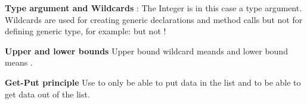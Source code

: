 \documentclass{article}
\begin{document}
\begin{Parallel}[v]{0.49\textwidth}{0.49\textwidth}
{        \textbf{Type argument and Wildcards}\newline
        :
        The Integer is in this case a type argument.\\
        Wildcards are used for creating generic declarations and method calls but not for defining generic type,
        for example:  but not !

        \textbf{Upper and lower bounds}\newline
        Upper bound wildcard meands  and lower bound means .

        \textbf{Get-Put principle}\newline
        Use  to only be able to put data in the list and
         to be able to get data out of the list.
    }
    \ParallelPar
\end{Parallel}
\end{document}
